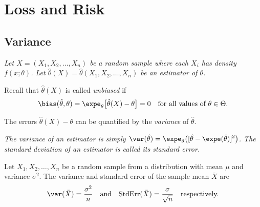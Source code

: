 \chapter{Loss and Risk}\label{chap:loss-and-risk}
\setcounter{page}{1}
\startcontents[chapters]
\chapcontents

\section{Variance}
%
\bit
\it Let $X=(X_1,X_2,\ldots,X_n)$ be a random sample where each $X_i$ has density $f(x;\theta)$.
\it Let $\hat{\theta}(X) = \hat{\theta}(X_1,X_2,\ldots,X_n)$ be an estimator of $\theta$.
\eit


Recall that $\hat{\theta}(X)$ is called \emph{unbiased} if
\[
\bias(\hat{\theta},\theta) = \expe_\theta\big[\hat{\theta}(X)-\theta\big] = 0 \text{\quad for all values of $\theta\in\Theta$.}
\]

The errors $\hat{\theta}(X)-\theta$ can be quantified by the \emph{variance} of $\hat{\theta}$.
\begin{definition}
\ben
\it The \emph{variance} of an estimator is simply 
$\displaystyle \var(\hat{\theta}) = \expe_\theta\big([\hat{\theta}-\expe(\hat{\theta})]^2\big)$.
\it The standard deviation of an estimator is called its \emph{standard error}.
\een
\end{definition}

\begin{example}
Let $X_1,X_2,\ldots,X_n$ be a random sample from a distribution with mean $\mu$ and variance $\sigma^2$. The variance and standard error of the sample mean $\bar{X}$ are 
\[
\var(\bar{X}) = \frac{\sigma^2}{n} \text{\quad and\quad} \text{StdErr}(\bar{X}) = \frac{\sigma}{\sqrt{n}} \text{\quad respectively.}
\]
\end{example}

